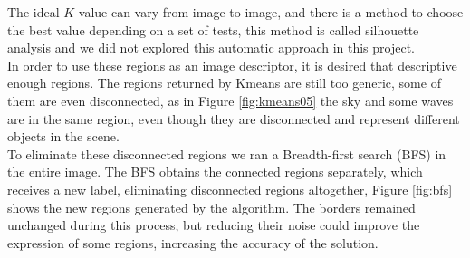 \documentclass[12pt,a4paper]{article}
\begin{document}
The ideal $K$ value can vary from image to image, and there is a method to choose the best value depending on a set of tests, this method is called silhouette analysis and we did not explored this automatic approach in this project. \\

In order to use these regions as an image descriptor, it is desired that descriptive enough regions. The regions returned by Kmeans are still too generic, some of them are even disconnected, as in Figure \ref{fig:kmeans05} the sky and some waves are in the same region, even though they are disconnected and represent different objects in the scene. \\

To eliminate these disconnected regions we ran a Breadth-first search (BFS) in the entire image. The BFS obtains the connected regions separately, which receives a new label, eliminating disconnected regions altogether, Figure \ref{fig:bfs} shows the new regions generated by the algorithm. The borders remained unchanged during this process, but reducing their noise could improve the expression of some regions, increasing the accuracy of the solution. \\
\end{document}
